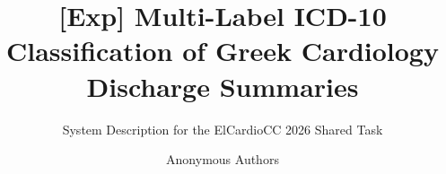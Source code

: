 \documentclass[runningheads]{llncs}
\begin{document}
\title{[Exp] Multi-Label ICD-10 Classification of Greek Cardiology Discharge Summaries}
\subtitle{System Description for the ElCardioCC 2026 Shared Task}

\author{Anonymous Authors}


\end{document}
